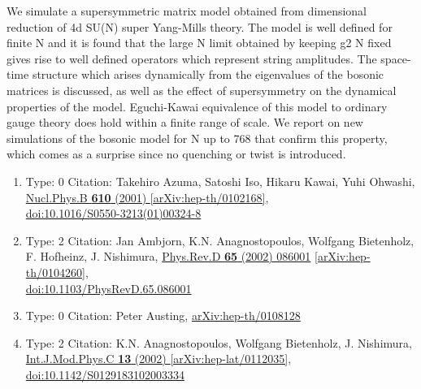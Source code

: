 \documentclass[a4paper,10pt]{article}
\begin{document}
\begin{enumerate}
We simulate a supersymmetric matrix model obtained from dimensional reduction of 4d SU(N) super Yang-Mills theory. The model is well defined for finite N and it is found that the large N limit obtained by keeping g2 N fixed gives rise to well defined operators which represent string amplitudes. The space-time structure which arises dynamically from the eigenvalues of the bosonic matrices is discussed, as well as the effect of supersymmetry on the dynamical properties of the model. Eguchi-Kawai equivalence of this model to ordinary gauge theory does hold within a finite range of scale. We report on new simulations of the bosonic model for N up to 768 that confirm this property, which comes as a surprise since no quenching or twist is introduced.
\begin{enumerate}
  \item Type: 0 Citation: Takehiro Azuma, Satoshi Iso, Hikaru Kawai, Yuhi Ohwashi, \href{https://www.doi.org/10.1016/S0550-3213(01)00324-8}{Nucl.Phys.B {\bf 610} (2001) }  \href{https://arxiv.org/abs/hep-th/0102168}{[arXiv:hep-th/0102168]},\\\href{https://www.doi.org/10.1016/S0550-3213(01)00324-8}{doi:10.1016/S0550-3213(01)00324-8}
  \item Type: 2 Citation: Jan Ambjorn, K.N. Anagnostopoulos, Wolfgang Bietenholz, F. Hofheinz, J. Nishimura, \href{https://www.doi.org/10.1103/PhysRevD.65.086001}{Phys.Rev.D {\bf 65} (2002) 086001}  \href{https://arxiv.org/abs/hep-th/0104260}{[arXiv:hep-th/0104260]},\\\href{https://www.doi.org/10.1103/PhysRevD.65.086001}{doi:10.1103/PhysRevD.65.086001}
  \item Type: 0 Citation: Peter Austing, \href{https://arxiv.org/abs/hep-th/0108128}{arXiv:hep-th/0108128}
  \item Type: 2 Citation: K.N. Anagnostopoulos, Wolfgang Bietenholz, J. Nishimura, \href{https://www.doi.org/10.1142/S0129183102003334}{Int.J.Mod.Phys.C {\bf 13} (2002) }  \href{https://arxiv.org/abs/hep-lat/0112035}{[arXiv:hep-lat/0112035]},\\\href{https://www.doi.org/10.1142/S0129183102003334}{doi:10.1142/S0129183102003334}

\end{enumerate}
\end{enumerate}
\end{document}
